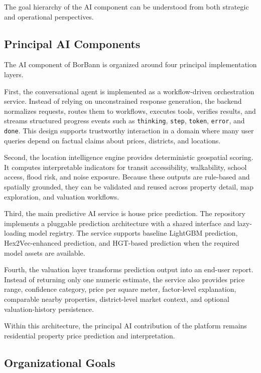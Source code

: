 The goal hierarchy of the AI component can be understood from both strategic and operational perspectives.

\subsection{Principal AI Components}

The AI component of BorBann is organized around four principal implementation layers.

First, the conversational agent is implemented as a workflow-driven orchestration service. Instead of relying on unconstrained response generation, the backend normalizes requests, routes them to workflows, executes tools, verifies results, and streams structured progress events such as \texttt{thinking}, \texttt{step}, \texttt{token}, \texttt{error}, and \texttt{done}. This design supports trustworthy interaction in a domain where many user queries depend on factual claims about prices, districts, and locations.

Second, the location intelligence engine provides deterministic geospatial scoring. It computes interpretable indicators for transit accessibility, walkability, school access, flood risk, and noise exposure. Because these outputs are rule-based and spatially grounded, they can be validated and reused across property detail, map exploration, and valuation workflows.

Third, the main predictive AI service is house price prediction. The repository implements a pluggable prediction architecture with a shared interface and lazy-loading model registry. The service supports baseline LightGBM prediction, Hex2Vec-enhanced prediction, and HGT-based prediction when the required model assets are available.

Fourth, the valuation layer transforms prediction output into an end-user report. Instead of returning only one numeric estimate, the service also provides price range, confidence category, price per square meter, factor-level explanation, comparable nearby properties, district-level market context, and optional valuation-history persistence.

Within this architecture, the principal AI contribution of the platform remains residential property price prediction and interpretation.

\subsection{Organizational Goals}


